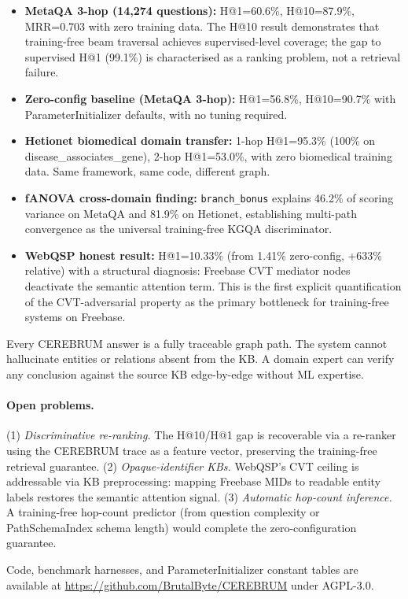 \documentclass[11pt,a4paper]{article}
\begin{document}
\begin{itemize}
  \item \textbf{MetaQA 3-hop (14,274 questions):} H@1=60.6\%, H@10=87.9\%,
    MRR=0.703 with zero training data. The H@10 result demonstrates that
    training-free beam traversal achieves supervised-level coverage; the gap to
    supervised H@1 (99.1\%) is characterised as a ranking problem, not a
    retrieval failure.
  \item \textbf{Zero-config baseline (MetaQA 3-hop):} H@1=56.8\%, H@10=90.7\%
    with ParameterInitializer defaults, with no tuning required.
  \item \textbf{Hetionet biomedical domain transfer:} 1-hop H@1=95.3\%
    (100\% on disease\_associates\_gene), 2-hop H@1=53.0\%, with zero biomedical
    training data. Same framework, same code, different graph.
  \item \textbf{fANOVA cross-domain finding:} \texttt{branch\_bonus} explains
    46.2\% of scoring variance on MetaQA and 81.9\% on Hetionet, establishing
    multi-path convergence as the universal training-free KGQA discriminator.
  \item \textbf{WebQSP honest result:} H@1=10.33\% (from 1.41\% zero-config,
    +633\% relative) with a structural diagnosis: Freebase CVT mediator nodes
    deactivate the semantic attention term. This is the first explicit
    quantification of the CVT-adversarial property as the primary bottleneck
    for training-free systems on Freebase.
\end{itemize}

Every CEREBRUM answer is a fully traceable graph path. The system cannot
hallucinate entities or relations absent from the KB. A domain expert can verify
any conclusion against the source KB edge-by-edge without ML expertise.

\paragraph{Open problems.}
(1) \textit{Discriminative re-ranking.} The H@10/H@1 gap is recoverable via
a re-ranker using the CEREBRUM trace as a feature vector, preserving the
training-free retrieval guarantee.
(2) \textit{Opaque-identifier KBs.} WebQSP's CVT ceiling is addressable via
KB preprocessing: mapping Freebase MIDs to readable entity labels restores
the semantic attention signal.
(3) \textit{Automatic hop-count inference.} A training-free hop-count predictor
(from question complexity or PathSchemaIndex schema length) would complete the
zero-configuration guarantee.

Code, benchmark harnesses, and ParameterInitializer constant tables are available
at \url{https://github.com/BrutalByte/CEREBRUM} under AGPL-3.0.



\end{document}
